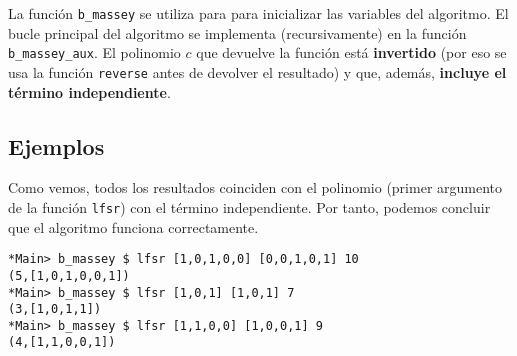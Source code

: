 \documentclass[10pt,spanish]{article}
\begin{document}
La función \texttt{b\_massey} se utiliza para para inicializar las variables del algoritmo. El bucle principal del algoritmo se implementa (recursivamente) en la función \texttt{b\_massey\_aux}. El polinomio $c$ que devuelve la función está \textbf{\textcolor{azul}{invertido}} (por eso se usa la función \texttt{reverse} antes de devolver el resultado) y que, además, \textbf{\textcolor{azul}{incluye el término independiente}}.

\subsection{\textcolor{azul}Ejemplos}

Como vemos, todos los resultados coinciden con el polinomio (primer argumento de la función \texttt{lfsr}) con el término independiente. Por tanto, podemos concluir que el algoritmo funciona correctamente.

\begin{verbatim}
*Main> b_massey $ lfsr [1,0,1,0,0] [0,0,1,0,1] 10
(5,[1,0,1,0,0,1])
*Main> b_massey $ lfsr [1,0,1] [1,0,1] 7
(3,[1,0,1,1])
*Main> b_massey $ lfsr [1,1,0,0] [1,0,0,1] 9
(4,[1,1,0,0,1])
\end{verbatim}
\end{document}
